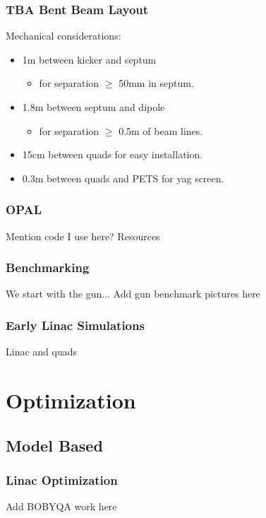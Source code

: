 \documentclass[professionalfonts,t]{beamer}
\begin{document}
\begin{frame}
\frametitle{TBA Bent Beam Layout}
\begin{tikzpicture}[scale=\textwidth/20cm, text=black]

\end{tikzpicture}

\vspace{-1em}
Mechanical considerations:
\begin{itemize}
	\item 1m between kicker and septum
	\begin{itemize}
		\item for separation $\ge$ 50mm in septum. 
	\end{itemize}
	\item 1.8m between septum and dipole
	\begin{itemize}
		\item for separation $\ge$ 0.5m of beam lines.
	\end{itemize}
	\item 15cm between quads for easy installation. 
	\item 0.3m between quads and PETS for yag screen.  
\end{itemize}
\end{frame}

\begin{frame}
	\frametitle{OPAL}
	Mention code I use here?
	Resources
\end{frame}


\begin{frame}
	\frametitle{Benchmarking}
	We start with the gun...
		Add gun benchmark pictures here
\end{frame}

\begin{frame}
	\frametitle{Early Linac Simulations}
	Linac and quads
\end{frame}


\section{Optimization}
\subsection{Model Based}
\begin{frame}
	\frametitle{Linac Optimization}
	Add BOBYQA work here
\end{frame}
\end{document}
